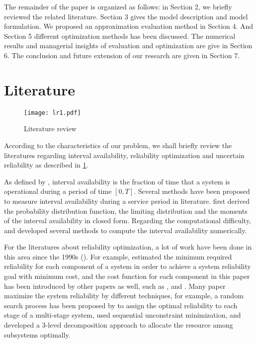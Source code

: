 \documentclass[preprint,12pt]{elsarticle}
\begin{document}
The remainder of the paper is organized as follows: in Section 2, we briefly reviewed the related literature. Section 3 gives the model description and model formulation. We proposed an approximation evaluation method in Section 4. And Section 5 different optimization methods has been discussed. The numerical results and managerial insights of evaluation and optimization are give in Section 6. The conclusion and future extension of our research are given in Section 7.
\section{Literature}

\begin{figure}
\centering
\texttt{[image: lr1.pdf]}
 \caption{Literature review}
 \label{fig:literature}
\end{figure}
According to the characteristics of our problem, we shall briefly review the literatures regarding interval availability, reliability optimization and uncertain reliability as described in \ref{fig:literature}.

As defined by \citet{Nakagawa}, interval availability is the fraction of time that a system is operational during a period of time $[0,T]$. Several methods have been proposed to measure interval availability during a service period in literature. \citet{Takacs} first derived the probability distribution function, the limiting distribution and the moments of the interval availability in closed form. Regarding the computational difficulty, \citet{DeSouza} and \citet{AlHanbali} developed several methods to compute the interval availability numerically.
%

 For the literatures about reliability optimization, a lot of work have been done in this area since the 1990s (\citet{Kuo}). For example, \citet{Mettas} estimated the minimum required reliability for each component of a system in order to achieve a system reliability goal with minimum cost, and the cost function for each component in this paper has been introduced by other papers as well, such as \citet{Huang}, \citet{Oner2010} and \citet{Jin}. Many paper maximize the system reliability by different techniques, for example, a random search process has been proposed by \citet{Beraha} to assign the optimal reliability to each stage of a multi-stage system, \citet{Hwang} used sequential unconstraint minimization, and \citet{Li} developed a 3-level decomposition approach to allocate the resource among subsystems optimally.
\end{document}
